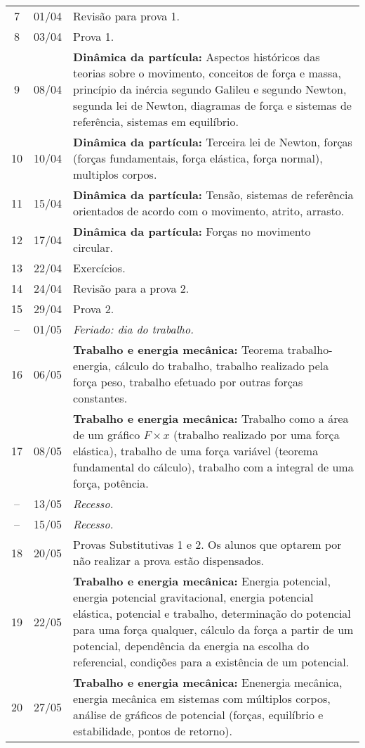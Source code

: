 \begin{center}
\begin{longtable}{ccp{70mm}}
  7 & 01/04 & Revisão para prova 1. \\
  8 & 03/04 & Prova 1. \\
  9 & 08/04 & \textbf{Dinâmica da partícula:} Aspectos históricos das teorias sobre o movimento, conceitos de força e massa, princípio da inércia segundo Galileu e segundo Newton, segunda lei de Newton, diagramas de força e sistemas de referência, sistemas em equilíbrio. \\
 10 & 10/04 & \textbf{Dinâmica da partícula:} Terceira lei de Newton, forças (forças fundamentais, força elástica, força normal), multiplos corpos. \\
 11 & 15/04 & \textbf{Dinâmica da partícula:} Tensão, sistemas de referência orientados de acordo com o movimento, atrito, arrasto. \\
 12 & 17/04 & \textbf{Dinâmica da partícula:} Forças no movimento circular. \\
 13 & 22/04 & Exercícios. \\
 14 & 24/04 & Revisão para a prova 2. \\
 15 & 29/04 & Prova 2.\\
 -- & 01/05 & \emph{Feriado: dia do trabalho.}\\
 16 & 06/05 & \textbf{Trabalho e energia mecânica:} Teorema trabalho-energia, cálculo do trabalho, trabalho realizado pela força peso, trabalho efetuado por outras forças constantes. \\
 17 & 08/05 & \textbf{Trabalho e energia mecânica:} Trabalho como a área de um gráfico $F \times x$ (trabalho realizado por uma força elástica), trabalho de uma força variável (teorema fundamental do cálculo), trabalho com a integral de uma força, potência. \\
 -- & 13/05 & \emph{Recesso.} \\
 -- & 15/05 & \emph{Recesso.} \\
 18 & 20/05 & Provas Substitutivas 1 e 2. Os alunos que optarem por não realizar a prova estão dispensados. \\
 19 & 22/05 & \textbf{Trabalho e energia mecânica:} Energia potencial, energia potencial gravitacional, energia potencial elástica, potencial e trabalho, determinação do potencial para uma força qualquer, cálculo da força a partir de um potencial, dependência da energia na escolha do referencial, condições para a existência de um potencial. \\
 20 & 27/05 & \textbf{Trabalho e energia mecânica:} Enenergia mecânica, energia mecânica em sistemas com múltiplos corpos, análise de gráficos de potencial (forças, equilíbrio e estabilidade, pontos de retorno).\\

\end{longtable}
\end{center}
